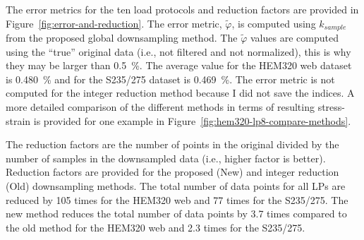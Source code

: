 \documentclass[a4paper,11pt]{article}
\begin{document}
The error metrics for the ten load protocols and reduction factors are provided in Figure~\ref{fig:error-and-reduction}.
The error metric, $\tilde{\varphi}$, is computed using $k_{sample}$ from the proposed global downsampling method.
The $\tilde{\varphi}$ values are computed using the ``true'' original data (i.e., not filtered and not normalized), this is why they may be larger than 0.5~\%.
The average value for the HEM320 web dataset is 0.480~\% and for the S235/275 dataset is 0.469~\%.
The error metric is not computed for the integer reduction method because I did not save the indices.
A more detailed comparison of the different methods in terms of resulting stress-strain is provided for one example in Figure~\ref{fig:hem320-lp8-compare-methods}.

The reduction factors are the number of points in the original divided by the number of samples in the downsampled data (i.e., higher factor is better).
Reduction factors are provided for the proposed (New) and integer reduction (Old) downsampling methods.
The total number of data points for all LPs are reduced by 105 times for the HEM320 web and 77 times for the S235/275.
The new method reduces the total number of data points by 3.7 times compared to the old method for the HEM320 web and 2.3 times for the S235/275.
\end{document}
